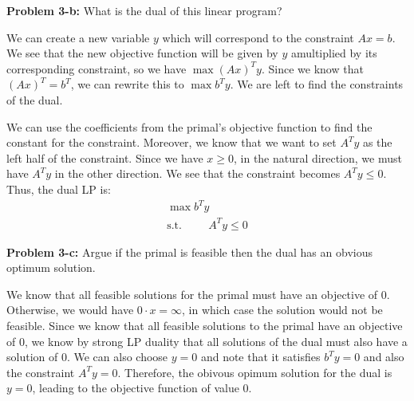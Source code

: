 \documentclass[psamsfonts]{amsart}
\newenvironment{sol}{\vspace{0.25cm}{\large \bfseries Solution:}}{\qedsymbol}
\newenvironment{prob}[1]{\begin{framed}{\large \bfseries Problem #1:}}{\end{framed}}
\begin{document}
\begin{prob}{3-b}
What is the dual of this linear program?
\end{prob}
\begin{sol}
We can create a new variable $y$ which will correspond to the constraint $Ax = b$. We see that the new objective function will be given by $y$ amultiplied by its corresponding constraint, so we have $\max (Ax)^T y$. Since we know that $(Ax)^T = b^T$, we can rewrite this to $\max b^T y$. We are left to find the constraints of the dual.

We can use the coefficients from the primal's objective function to find the constant for the constraint. Moreover, we know that we want to set $A^T y$ as the left half of the constraint. Since we have $x \geq 0$, in the natural direction, we must have $A^T y$ in the other direction. We see that the constraint becomes $A^T y \leq 0$. Thus, the dual LP is:
\begin{eqnarray}
\max b^T y \\
\text{s.t.} \hspace{1cm} A^T y \leq 0
\end{eqnarray}
\end{sol}

\begin{prob}{3-c}
Argue if the primal is feasible then the dual has an obvious optimum solution.
\end{prob}
\begin{sol}
We know that all feasible solutions for the primal must have an objective of 0. Otherwise, we would have $0 \cdot x = \infty$, in which case the solution would not be feasible. Since we know that all feasible solutions to the primal have an objective of 0, we know by strong LP duality that all solutions of the dual must also have a solution of 0. We can also choose $y = 0$ and note that it satisfies $b^T y = 0$ and also the constraint $A^T y = 0$. Therefore, the obivous opimum solution for the dual is $y = 0$, leading to the objective function of value 0.
\end{sol}
\end{document}

